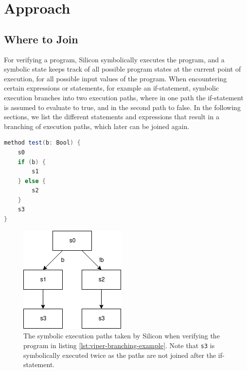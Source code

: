\documentclass[11pt]{article}
\begin{document}
    \newpage
    \section{Approach} \label{p2-approach}

    \subsection{Where to Join} \label{where-to-join}

    For verifying a program, Silicon symbolically executes the program,
    and a symbolic state keeps track of all possible program states at the current point of execution, for all
    possible input values of the program. When encountering certain expressions or statements, for example an
    if-statement, symbolic execution branches into two execution paths, where in
    one path the if-statement is assumed to evaluate to true, and in the second path to false.
    In the following sections, we list the different statements and expressions 
    that result in a branching of execution paths, which later can be joined again.
    
    \begin{lstlisting}[language=Scala, caption={An example Viper program to demonstrate how branching relates to the number of symbolic execution paths. Let \texttt{s0}, \texttt{s1}, \texttt{s2} and \texttt{s3} denote generic viper statements.}, label={lst:viper-branching-example}]
method test(b: Bool) {
    s0
    if (b) {
        s1
    } else {
        s2
    }
    s3
}       
    \end{lstlisting}

    \begin{figure}[H]
        \begin{center}
            \includegraphics[width=0.4\linewidth]{example-execution-paths.png}
            \caption{
                The symbolic execution paths taken by Silicon
                when verifying the program in listing \ref{lst:viper-branching-example}.
                Note that \texttt{s3} is symbolically executed twice as
                the paths are not joined after the if-statement.
            }
            \label{fig:example-execution-paths}
        \end{center}   
    \end{figure}
\end{document}
